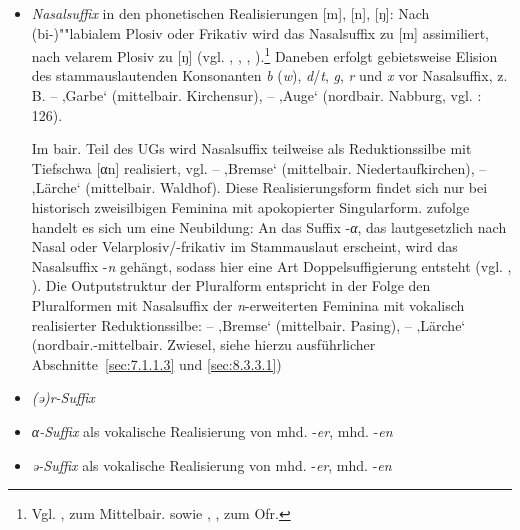 \begin{itemize}
\item \textit{Nasalsuffix} in den phonetischen Realisierungen [m], [n], [ŋ]: Nach (bi-)""labialem Plosiv oder Frikativ wird das Nasalsuffix zu [m] assimiliert, nach velarem Plosiv zu [ŋ] (vgl. \citealt[Karte 24]{Kranzmayer1956}, \citealt[126 und Karte 220]{Rowley1997}, \citealt[388]{Schirmunski1962}, \citealt[§578--580]{Schmeller1821}).\footnote{Vgl. \citet[57--58]{Kufner1961}, \citet[121]{Steininger1994} zum Mittelbair. sowie \citet[§45.I]{Hain1936}, \citet[67--68]{Kemmeter1924}, \citet[15]{Köhler1934} zum Ofr.} Daneben erfolgt gebietsweise Elision des stammauslautenden Konsonanten \textit{b} (\textit{w}), \textit{d}/\textit{t}, \textit{g}, \textit{r} und \textit{x} vor Nasalsuffix, z.\,B.  --  ‚Garbe‘ (mittelbair. Kirchensur),  --  ‚Auge‘ (nordbair. Nabburg, vgl. \citealt{Rowley1997}: 126).

Im bair. Teil des UGs wird Nasalsuffix teilweise als Reduktionssilbe mit Tiefschwa [αn] realisiert, vgl.  --  ‚Bremse‘ (mittelbair. Niedertaufkirchen),  --  ‚Lärche‘ (mittelbair. Waldhof). Diese Realisierungsform findet sich nur bei historisch zweisilbigen Feminina mit apokopierter Singularform. \citet[§26]{Micko-Repp1933} zufolge handelt es sich um eine Neubildung: An das Suffix -\textit{α}, das lautgesetzlich nach Nasal oder Velarplosiv/-frikativ im Stammauslaut erscheint, wird das Nasalsuffix -\textit{n} gehängt, sodass hier eine Art Doppelsuffigierung entsteht (vgl. \citealt[§49]{Kollmer1985}, \citealt[153]{Rowley1997}). Die Outputstruktur der Pluralform entspricht in der Folge den Pluralformen mit Nasalsuffix der \textit{n}{}-erweiterten Feminina mit vokalisch realisierter Reduktionssilbe:  --  ‚Bremse‘ (mittelbair. Pasing),  --  ‚Lärche‘ (nordbair.-mittelbair. Zwiesel, siehe hierzu ausführlicher Abschnitte~\ref{sec:7.1.1.3} und \ref{sec:8.3.3.1})

\item \textit{\textit{(ə)r}{}-Suffix}
\item \textit{\textit{α}}\textit{{}-Suffix} als vokalische Realisierung von mhd. -\textit{er}, mhd. -\textit{en}
\item \textit{\textit{ə}}\textit{{}-Suffix} als vokalische Realisierung von mhd. -\textit{er}, mhd. -\textit{en}
\end{itemize}

